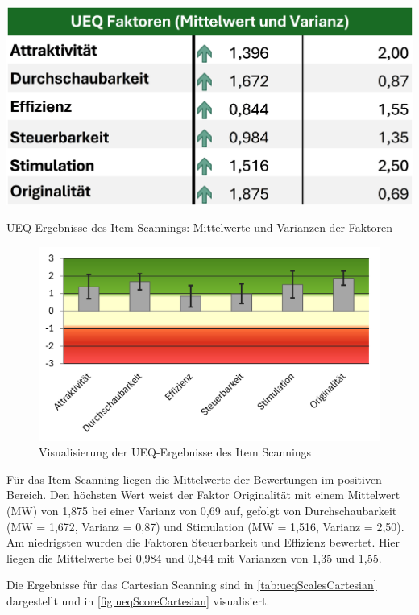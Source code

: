 \begin{table}[tbh]
    \centering
    \includegraphics{images/Results/UEQ-Table-Means-Item.png}
    \caption{UEQ-Ergebnisse des Item Scannings: Mittelwerte und Varianzen der Faktoren}
    \label{tab:ueqScalesItem}
\end{table}

\begin{figure}[tbh]
    \centering
    \includegraphics{images/Results/UEQ-Item.png}
    \caption{Visualisierung der UEQ-Ergebnisse des Item Scannings}
    \label{fig:ueqScoreItem}
\end{figure}

Für das Item Scanning liegen die Mittelwerte der Bewertungen im positiven Bereich. Den höchsten Wert weist der Faktor Originalität mit einem Mittelwert (MW) von 1,875 bei einer Varianz von 0,69 auf, gefolgt von Durchschaubarkeit (MW = 1,672, Varianz = 0,87) und Stimulation (MW = 1,516, Varianz = 2,50). Am niedrigsten wurden die Faktoren Steuerbarkeit und Effizienz bewertet. Hier liegen die Mittelwerte bei 0,984 und 0,844 mit Varianzen von 1,35 und 1,55. 

Die Ergebnisse für das Cartesian Scanning sind in \autoref{tab:ueqScalesCartesian} dargestellt und in \autoref{fig:ueqScoreCartesian} visualisiert. 


